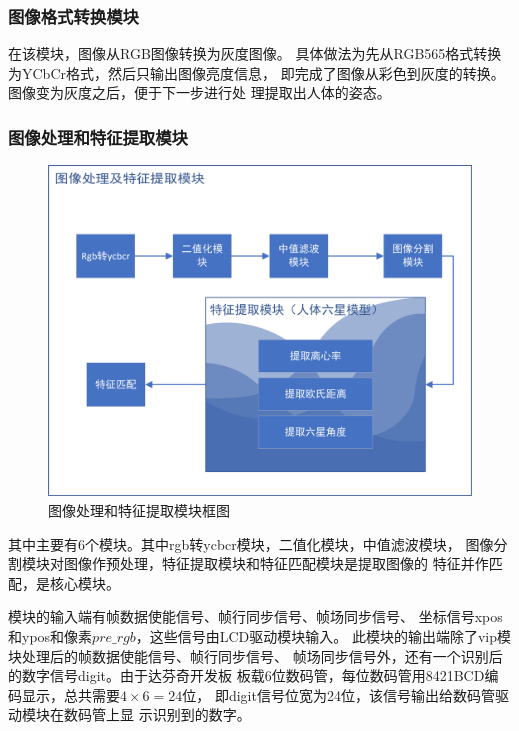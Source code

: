 \documentclass[UTF-8, a4paper, 12pt]{ctexart}
\begin{document}
\subsubsection{图像格式转换模块}
    在该模块，图像从RGB图像转换为灰度图像。
    具体做法为先从RGB565格式转换为YCbCr格式，然后只输出图像亮度信息，
    即完成了图像从彩色到灰度的转换。图像变为灰度之后，便于下一步进行处
    理提取出人体的姿态。

\subsubsection{图像处理和特征提取模块}
\begin{figure}[htbp]
    \centering
    \includegraphics[width=15cm]{figs/f2.png}
    \caption{图像处理和特征提取模块框图}
\end{figure}

其中主要有6个模块。其中rgb转ycbcr模块，二值化模块，中值滤波模块，
图像分割模块对图像作预处理，特征提取模块和特征匹配模块是提取图像的
特征并作匹配，是核心模块。

模块的输入端有帧数据使能信号、帧行同步信号、帧场同步信号、
坐标信号xpos和ypos和像素$pre\_rgb$，这些信号由LCD驱动模块输入。
此模块的输出端除了vip模块处理后的帧数据使能信号、帧行同步信号、
帧场同步信号外，还有一个识别后的数字信号digit。由于达芬奇开发板
板载6位数码管，每位数码管用8421BCD编码显示，总共需要$4\times 6=24$位，
即digit信号位宽为24位，该信号输出给数码管驱动模块在数码管上显
示识别到的数字。
\end{document}
